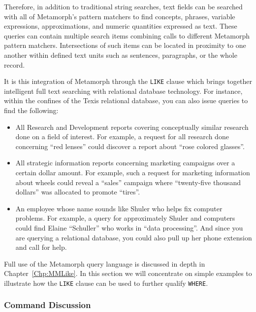 Therefore, in addition to traditional string searches, text fields can
be searched with all of Metamorph's pattern matchers to find concepts,
phrases, variable expressions, approximations, and numeric quantities
expressed as text.  These queries can contain multiple search items
combining calls to different Metamorph pattern matchers.
Intersections of such items can be located in proximity to one another
within defined text units such as sentences, paragraphs, or the whole
record.

It is this integration of Metamorph through the \verb`LIKE` clause which
brings together intelligent full text searching with relational
database technology.  For instance, within the confines of the Texis
relational database, you can also issue queries to find the following:

\begin{itemize}
\item All Research and Development reports covering conceptually
similar research done on a field of interest.  For example, a request
for all research done concerning ``red lenses'' could discover a
report about ``rose colored glasses''.

\item All strategic information reports concerning marketing campaigns
over a certain dollar amount.  For example, such a request for
marketing information about wheels could reveal a ``sales'' campaign
where ``twenty-five thousand dollars'' was allocated to promote
``tires''.

\item An employee whose name sounds like Shuler who helps fix computer
problems.  For example, a query for approximately Shuler and computers
could find Elaine ``Schuller'' who works in ``data processing''. And
since you are querying a relational database, you could also pull up
her phone extension and call for help.
\end{itemize}

Full use of the Metamorph query language is discussed in depth in
Chapter~\ref{Chp:MMLike}.  In this section we will concentrate on
simple examples to illustrate how the \verb`LIKE` clause can be used to
further qualify \verb`WHERE`.

\subsubsection{Command Discussion}

